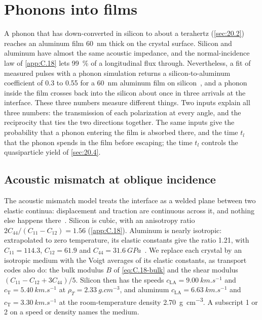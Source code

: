 \section{Phonons into films}\label{sec:20.3}

A phonon that has down-converted in silicon to about a terahertz (\cref{sec:20.2}) reaches an aluminum film \SI{60}{nm} thick on the crystal surface. Silicon and aluminum have almost the same acoustic impedance, and the normal-incidence law of \cref{app:C.18} lets \SI{99}{\percent} of a longitudinal flux through. Nevertheless, a fit of measured pulses with a phonon simulation returns a silicon-to-aluminum coefficient of 0.3 to 0.55 for a \SI{60}{nm} aluminum film on silicon~\cite{martinez2019measurements}, and a phonon inside the film crosses back into the silicon about once in three arrivals at the interface. These three numbers measure different things. Two inputs explain all three numbers: the transmission of each polarization at every angle, and the reciprocity that ties the two directions together. The same inputs give the probability that a phonon entering the film is absorbed there, and the time $t_l$ that the phonon spends in the film before escaping; the time $t_l$ controls the quasiparticle yield of \cref{sec:20.4}.

\subsection{Acoustic mismatch at oblique incidence}\label{sec:20.3-amm}

The acoustic mismatch model treats the interface as a welded plane between two elastic continua: displacement and traction are continuous across it, and nothing else happens there~\cite{swartz1989thermal}. Silicon is cubic, with an anisotropy ratio $2C_{44}/(C_{11} - C_{12}) = 1.56$ (\cref{app:C.18}). Aluminum is nearly isotropic: extrapolated to zero temperature, its elastic constants give the ratio 1.21, with $C_{11} = 114.3$, $C_{12} = 61.9$ and $C_{44} = \SI{31.6}{GPa}$~\cite[Table~2]{malica2020quasi}. We replace each crystal by an isotropic medium with the Voigt averages of its elastic constants, as transport codes also do: the bulk modulus $B$ of \cref{eq:C.18-bulk} and the shear modulus $(C_{11} - C_{12} + 3C_{44})/5$. Silicon then has the speeds $c_{\mathrm{LA}} = \SI{9.00}{km.s^{-1}}$ and $c_{\mathrm{T}} = \SI{5.40}{km.s^{-1}}$ at $\rho_T = \SI{2.33}{g.cm^{-3}}$, and aluminum $c_{\mathrm{LA}} = \SI{6.63}{km.s^{-1}}$ and $c_{\mathrm{T}} = \SI{3.30}{km.s^{-1}}$ at the room-temperature density \SI{2.70}{g.cm^{-3}}. A subscript 1 or 2 on a speed or density names the medium.

